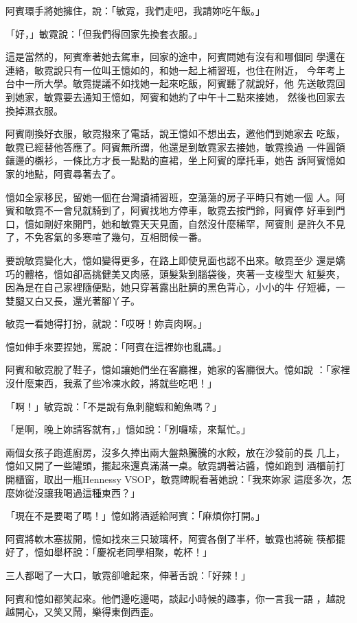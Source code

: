 阿賓環手將她擁住，說：「敏霓，我們走吧，我請妳吃午飯。」

「好，」敏霓說：「但我們得回家先換套衣服。」

這是當然的，阿賓牽著她去駕車，回家的途中，阿賓問她有沒有和哪個同
學還在連絡，敏霓說只有一位叫王憶如的，和她一起上補習班，也住在附近，
今年考上台中一所大學。敏霓提議不如找她一起來吃飯，阿賓聽了就說好，他
先送敏霓回到她家，敏霓要去通知王憶如，阿賓和她約了中午十二點來接她，
然後也回家去換掉濕衣服。

阿賓剛換好衣服，敏霓撥來了電話，說王憶如不想出去，邀他們到她家去
吃飯，敏霓已經替他答應了。阿賓無所謂，他還是到敏霓家去接她，敏霓換過
一件圓領鑲邊的櫬衫，一條比方才長一點點的直裙，坐上阿賓的摩托車，她告
訴阿賓憶如家的地點，阿賓尋著去了。

憶如全家移民，留她一個在台灣讀補習班，空蕩蕩的房子平時只有她一個
人。阿賓和敏霓不一會兒就騎到了，阿賓找地方停車，敏霓去按門鈴，阿賓停
好車到門口，憶如剛好來開門，她和敏霓天天見面，自然沒什麼稀罕，阿賓則
是許久不見了，不免客氣的多寒喧了幾句，互相問候一番。

要說敏霓變化大，憶如變得更多，在路上即使見面也認不出來。敏霓至少
還是嬌巧的體格，憶如卻高挑健美又肉感，頭髮紮到腦袋後，夾著一支梭型大
紅髮夾，因為是在自己家裡隨便點，她只穿著露出肚臍的黑色背心，小小的牛
仔短褲，一雙腿又白又長，還光著腳丫子。

敏霓一看她得打扮，就說：「哎呀！妳賣肉啊。」

憶如伸手來要捏她，罵說：「阿賓在這裡妳也亂講。」

阿賓和敏霓脫了鞋子，憶如讓她們坐在客廳裡，她家的客廳很大。憶如說
：「家裡沒什麼東西，我煮了些冷凍水餃，將就些吃吧！」

「啊！」敏霓說：「不是說有魚刺龍蝦和鮑魚嗎？」

「是啊，晚上妳請客就有，」憶如說：「別囉嗦，來幫忙。」

兩個女孩子跑進廚房，沒多久捧出兩大盤熱騰騰的水餃，放在沙發前的長
几上，憶如又開了一些罐頭，擺起來還真滿滿一桌。敏霓調著沾醬，憶如跑到
酒櫃前打開櫃窗，取出一瓶Hennessy VSOP，敏霓睥睨看著她說：「我來妳家
這麼多次，怎麼妳從沒讓我喝過這種東西？」

「現在不是要喝了嗎！」憶如將酒遞給阿賓：「麻煩你打開。」

阿賓將軟木塞拔開，憶如找來三只玻璃杯，阿賓各倒了半杯，敏霓也將碗
筷都擺好了，憶如舉杯說：「慶祝老同學相聚，乾杯！」

三人都喝了一大口，敏霓卻嗆起來，伸著舌說：「好辣！」

阿賓和憶如都笑起來。他們邊吃邊喝，談起小時候的趣事，你一言我一語
，越說越開心，又笑又鬧，樂得東倒西歪。

